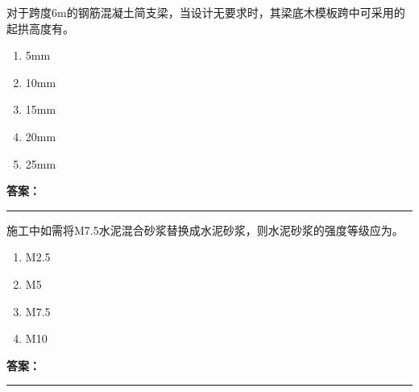 \documentclass[UTF8,fontset=fandol,11pt]{ctexart}
\newcommand{\answerline}{\textcolor{answerred}{\rule{2.4cm}{0.7pt}}}
\begin{document}
\begin{quizbox}[title={乱序第 168 题｜第四章混凝土结构工程}]

对于跨度6m的钢筋混凝土简支梁，当设计无要求时，其梁底木模板跨中可采用的起拱高度有。\\

\begin{enumerate}[label=\Alph*.]

\item 5mm

\item 10mm

\item 15mm

\item 20mm

\item 25mm

\end{enumerate}

\textbf{\textcolor{answerred}{答案：}} \answerline

\end{quizbox}

\vspace{0.2em}

\begin{quizbox}[title={乱序第 169 题｜第六章砌筑工程}]

施工中如需将M7.5水泥混合砂浆替换成水泥砂浆，则水泥砂浆的强度等级应为。\\

\begin{enumerate}[label=\Alph*.]

\item M2.5

\item M5

\item M7.5

\item M10

\end{enumerate}

\textbf{\textcolor{answerred}{答案：}} \answerline

\end{quizbox}

\vspace{0.2em}
\end{document}
